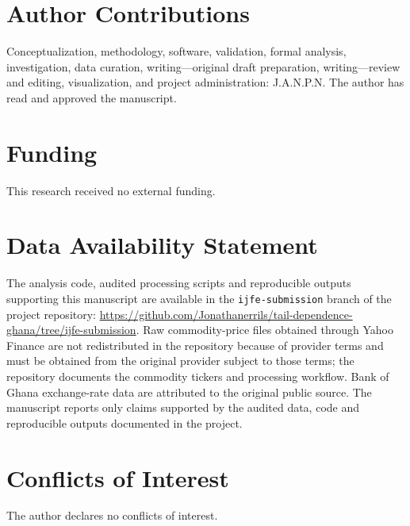 \documentclass[12pt,a4paper]{article}
\begin{document}
\section*{Author Contributions}
Conceptualization, methodology, software, validation, formal analysis, investigation, data curation, writing---original draft preparation, writing---review and editing, visualization, and project administration: J.A.N.P.N. The author has read and approved the manuscript.

\section*{Funding}
This research received no external funding.

\section*{Data Availability Statement}
The analysis code, audited processing scripts and reproducible outputs supporting this manuscript are available in the \texttt{ijfe-submission} branch of the project repository: \url{https://github.com/Jonathanerrils/tail-dependence-ghana/tree/ijfe-submission}. Raw commodity-price files obtained through Yahoo Finance are not redistributed in the repository because of provider terms and must be obtained from the original provider subject to those terms; the repository documents the commodity tickers and processing workflow. Bank of Ghana exchange-rate data are attributed to the original public source. The manuscript reports only claims supported by the audited data, code and reproducible outputs documented in the project.

\section*{Conflicts of Interest}
The author declares no conflicts of interest.



\end{document}
